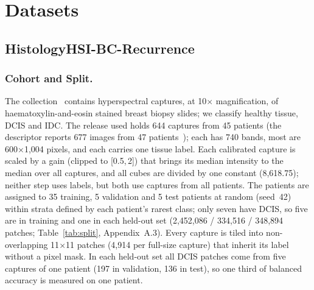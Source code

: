 \documentclass{svproc}
\begin{document}
\section{Datasets}\label{sec:data}
\subsection{HistologyHSI-BC-Recurrence}
\subsubsection{Cohort and Split.}
The collection~\cite{hsibc_data,hsibc_desc} contains hyperspectral captures, at 10$\times$ magnification, of haematoxylin-and-eosin stained breast biopsy slides; we classify healthy tissue, DCIS and IDC. The release used holds 644 captures from 45 patients (the descriptor reports 677 images from 47 patients~\cite{hsibc_desc}); each has 740 bands, most are 600$\times$1,004 pixels, and each carries one tissue label. Each calibrated capture is scaled by a gain (clipped to [0.5,\,2]) that brings its median intensity to the median over all captures, and all cubes are divided by one constant (8,618.75); neither step uses labels, but both use captures from all patients. The patients are assigned to 35 training, 5 validation and 5 test patients at random (seed~42) within strata defined by each patient's rarest class; only seven have DCIS, so five are in training and one in each held-out set (2,452,086 / 334,516 / 348,894 patches; Table~\ref{tab:split}, Appendix~A.3). Every capture is tiled into non-overlapping 11$\times$11 patches (4,914 per full-size capture) that inherit its label without a pixel mask. In each held-out set all DCIS patches come from five captures of one patient (197 in validation, 136 in test), so one third of balanced accuracy is measured on one patient.
\end{document}
